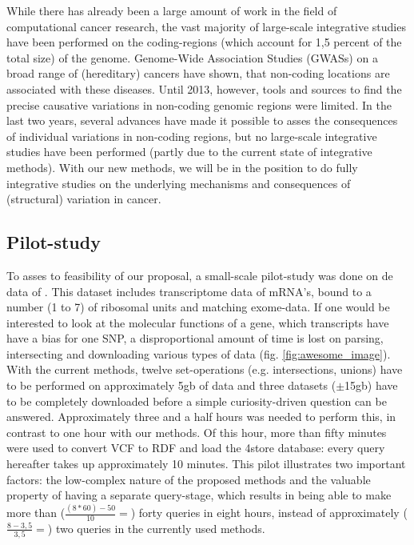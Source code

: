 \documentclass[twoside,fontsize=10pt]{article}
\begin{document}
\noindent
While there has already been a large amount of work in the field of computational cancer research, the vast majority of large-scale integrative studies have been performed on the coding-regions (which account for 1,5 percent of the total size) of the genome\cite{ENCODE}. Genome-Wide Association Studies (GWASs) on a broad range of (hereditary) cancers have shown, that non-coding locations are associated with these diseases. Until 2013, however, tools and sources to find the precise causative variations in non-coding genomic regions were limited. In the last two years, several advances have made it possible to asses the consequences of individual variations in non-coding regions\cite{Ongen2014,Khurana2013}, but no large-scale integrative studies have been performed (partly due to the current state of integrative methods). With our new methods, we will be in the position to do fully integrative studies on the underlying mechanisms and consequences of (structural) variation in cancer.

\subsection*{Pilot-study}
To asses to feasibility of our proposal, a small-scale pilot-study was done on de data of \citet{VanHeesch2014}. This dataset includes transcriptome data of mRNA's, bound to a number (1 to 7) of ribosomal units and matching exome-data. If one would be interested to look at the molecular functions of a gene, which transcripts have have a bias for one SNP, a disproportional amount of time is lost on parsing, intersecting and downloading various types of data (fig. \ref{fig:awesome_image}). With the current methods, twelve set-operations (e.g. intersections, unions) have to be performed on approximately 5gb of data and three datasets ($\pm$15gb) have to be completely downloaded before a simple curiosity-driven question can be answered. Approximately three and a half hours was needed to perform this, in contrast to one hour with our methods. Of this hour, more than fifty minutes were used to convert VCF to RDF and load the 4store database: every query hereafter takes up approximately 10 minutes. This pilot illustrates two important factors: the low-complex nature of the proposed methods and the valuable property of having a separate query-stage, which results in being able to make more than ($\frac{(8*60)-50}{10}= $) forty queries in eight hours, instead of approximately ($\frac{8-3,5}{3,5}= $) two queries in the currently used methods.
\end{document}
